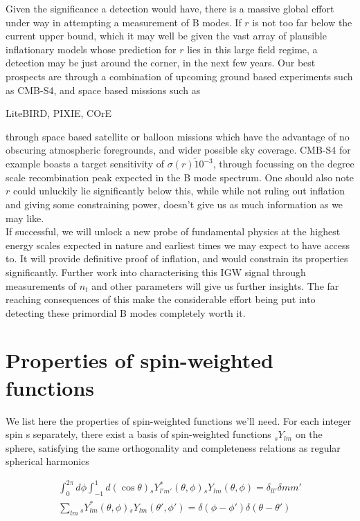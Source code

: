 \documentclass[a4paper,10pt]{article}
\begin{document}
Given the significance a detection would have, there is a massive global effort under way in attempting a measurement of B modes. If $r$ is not too far below the current upper bound, which it may well be given the vast array of plausible inflationary models whose prediction for $r$ lies in this large field regime, a detection may be just around the corner, in the next few years. Our best prospects are through a combination of upcoming ground based experiments such as CMB-S4, and space based missions such as 

LiteBIRD, PIXIE, COrE


 through space based satellite or balloon missions which have the advantage of no obscuring atmospheric foregrounds, and wider possible sky coverage. CMB-S4 for example boasts a target sensitivity of $\sigma(r) \tilde 10^{-3}$, through focussing on the degree scale recombination peak expected in the B mode spectrum. One should also note $r$ could unluckily lie significantly below this, while while not ruling out inflation and giving some constraining power, doesn't give us as much information as we may like.\\

If successful, we will unlock a new probe of fundamental physics at the highest energy scales expected in nature and earliest times we may expect to have access to. It will provide definitive proof of inflation, and would constrain its properties significantly. Further work into characterising this IGW signal through measurements of $n_t$ and other parameters will give us further insights. The far reaching consequences of this make the considerable effort being put into detecting these primordial B modes completely worth it. 


\newpage

\appendix

\section{Properties of spin-weighted functions}
\label{swf}

We list here the properties of spin-weighted functions we'll need. For each integer spin s separately, there exist a basis of spin-weighted functions $_sY_{lm}$ on the sphere, satisfying the same orthogonality and completeness relations as regular spherical harmonics

\begin{equation}
\begin{split}
\int_0^{2\pi} d\phi \int_{-1}^{1} d(\cos{\theta}) {}_sY_{l'm'}^*(\theta,\phi){}_sY_{lm}(\theta,\phi) = \delta_{ll'}\delta{mm'} \\
\sum_{lm} {}_sY_{lm}^*(\theta,\phi){}_sY_{lm}(\theta',\phi')=\delta(\phi-\phi')\delta(\theta-\theta')
\end{split}
\end{equation}
\end{document}
